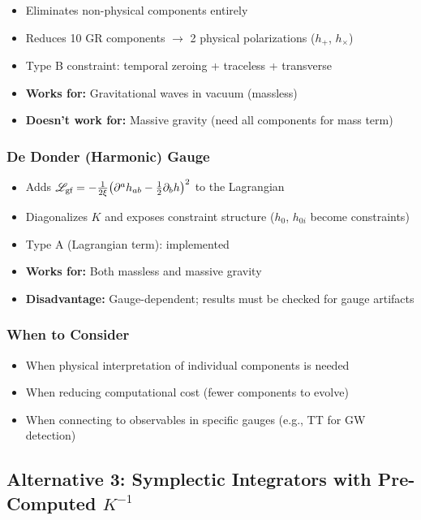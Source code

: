 \begin{itemize}
  \item Eliminates non-physical components entirely
  \item Reduces 10 GR components $\to$ 2 physical polarizations ($h_+$, $h_\times$)
  \item Type B constraint: temporal zeroing + traceless + transverse
  \item \textbf{Works for:} Gravitational waves in vacuum (massless)
  \item \textbf{Doesn't work for:} Massive gravity (need all components for mass term)
\end{itemize}

\subsubsection{De Donder (Harmonic) Gauge}
\label{sec:kinetic-dedonder}

\begin{itemize}
  \item Adds $\mathscr{L}_\text{gf} = -\frac{1}{2\xi}\bigl(\partial^a h_{ab} - \tfrac{1}{2}\partial_b h\bigr)^2$ to the Lagrangian
  \item Diagonalizes $K$ and exposes constraint structure ($h_0$, $h_{0i}$ become constraints)
  \item Type A (Lagrangian term): implemented
  \item \textbf{Works for:} Both massless and massive gravity
  \item \textbf{Disadvantage:} Gauge-dependent; results must be checked for gauge artifacts
\end{itemize}

\subsubsection{When to Consider}
\label{sec:kinetic-alt2-when}

\begin{itemize}
  \item When physical interpretation of individual components is needed
  \item When reducing computational cost (fewer components to evolve)
  \item When connecting to observables in specific gauges (e.g., TT for GW detection)
\end{itemize}


\subsection{Alternative 3: Symplectic Integrators with Pre-Computed $K^{-1}$}
\label{sec:kinetic-alt3}

